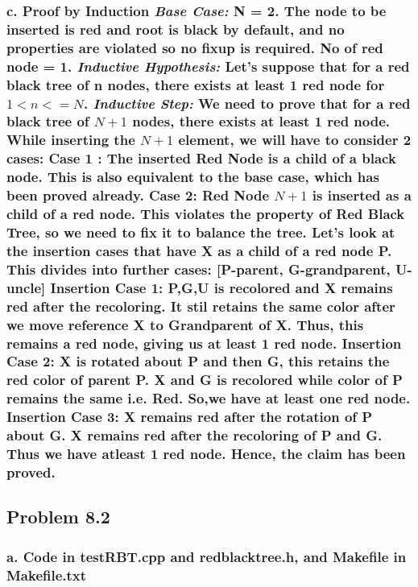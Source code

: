 \documentclass[a4paper,12pt]{article}
\begin{document}
\newpage

\subsubsection*{\textnormal { \newpage c. \textbf {Proof by Induction} \newline \newline
\textit {Base Case:}
\newline 
N = 2. The node to be inserted is red and root is black by default, and no properties are violated so no fixup is required. No of red node = 1.
\newline \newline
\textit {Inductive Hypothesis:} Let's suppose that for a red black tree of n nodes, there exists at least 1 red node for $ 1 < n <= N $.
\newline \newline \textit{Inductive Step:} We need to prove that for a red black tree of $N+1$ nodes, there exists at least 1 red node.
\newline \newline
While inserting the $ N+1$ element, we will have to consider 2 cases:
\newline \newline
Case 1 :  The inserted Red Node is a child of a black node. This is also equivalent to the base case, which has been proved already.
\newline \newline
Case 2: Red Node $N+1$ is inserted as a child of a red node. This violates the property of Red Black Tree, so we need to fix it to balance the tree.
Let's look at the insertion cases that have X as a child of a red node P. This divides into further cases: [P-parent, G-grandparent, U-uncle] \newline \newline 
Insertion Case 1: P,G,U is recolored and X remains red after the recoloring. It stil retains the
same color after we move reference X to Grandparent of X. Thus, this remains a red node, giving us at least 1 red node.
\newline \newline
Insertion Case 2: X is rotated about P and then G, this retains the red color of parent P. X and G is recolored while color of P remains the same i.e. Red. So,we have at least one red node.
\newline \newline
Insertion Case 3: X remains red after the rotation of P about G. X remains red after
the recoloring of P and G. Thus we have atleast 1 red node.
\newline \newline 
Hence, the claim has been proved. \newline \newline}}

\subsection*{Problem 8.2\newline}
\subsubsection*{\textnormal{a. Code in testRBT.cpp and redblacktree.h, and Makefile in Makefile.txt}}
\end{document}
